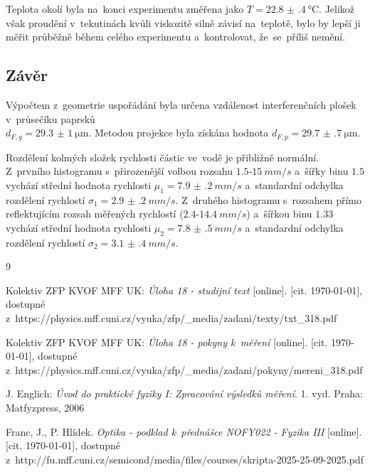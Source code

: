 \documentclass{../concepts/titul_zprava_p/prepareprotokolZprava} %
\begin{document}
Teplota okolí byla na~konci experimentu změřena jako $T = \qty{22.8(4)}{\degreeCelsius}$. Jelikož však proudění 
v~tekutinách kvůli viskozitě silně závisí na~teplotě, bylo by lepší ji měřit průběžně během celého experimentu a~kontrolovat,
že~se~příliš nemění.

\subsection{Závěr}
Výpočtem z~geometrie uspořádání byla určena vzdálenost interferenčních plošek v~průsečíku paprsků \\
$d_{F,g} = \qty{29.3(10)}{\micro \meter}$. Metodou projekce byla získána hodnota $d_{F,p} = \qty{29.7(7)}{\micro \meter}$.

Rozdělení kolmých složek rychlosti částic ve~vodě je přibližně normální. Z~prvního histogramu s~přirozenější volbou
rozsahu $1.5$-$\qty{15}{mm \per s}$ a~šířky binu $1.5$ vychází střední hodnota rychlosti $\mu_1 = \qty{7.9(2)}{mm/s}$ 
a~standardní odchylka rozdělení rychlostí $\sigma_1 = \qty{2.9(2)}{mm/s}$. Z~druhého histogramu s~rozsahem
přímo reflektujícím rozsah měřených rychlostí ($2.4$-$\qty{14.4}{mm \per s}$) a~šířkou binu $1.33$ vychází střední hodnota rychlosti $\mu_2 = \qty{7.8(5)}{mm/s}$
a~standardní odchylka rozdělení rychlostí $\sigma_2 = \qty{3.1(4)}{mm/s}$.


\begin{thebibliography}{9}

 Kolektiv ZFP KVOF MFF UK: \textit{Úloha 18 - studijní text} [online]. 
[cit. \today], dostupné z~https://physics.mff.cuni.cz/vyuka/zfp/\_media/zadani/texty/txt\_318.pdf

 Kolektiv ZFP KVOF MFF UK: \textit{Úloha 18 - pokyny k~měření} [online]. [cit. \today], dostupné
z~https://physics.mff.cuni.cz/vyuka/zfp/\_media/zadani/pokyny/mereni\_318.pdf


 J. Englich: \textit{Úvod do praktické fyziky I: Zpracování výsledků měření}. 
1. vyd. Praha: Matfyzpress, 2006

 Franc, J., P. Hlídek. \textit{Optika - podklad k~přednášce NOFY022 - Fyzika III}
[online]. [cit. \today], dostupné
z~http://fu.mff.cuni.cz/semicond/media/files/courses/skripta-2025-25-09-2025.pdf


\end{thebibliography}
\end{document}
